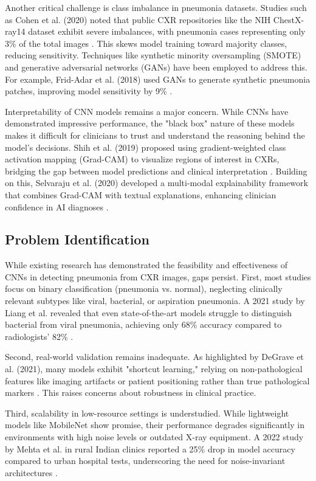 \documentclass[
  twocolumn,
  10pt,
  a4paper,
  journal
]{IEEEtran}
\begin{document}
Another critical challenge is class imbalance in pneumonia datasets. Studies such as Cohen et al. (2020) noted that public CXR repositories like the NIH ChestX-ray14 dataset exhibit severe imbalances, with pneumonia cases representing only 3\% of the total images \cite{cohen2020}. This skews model training toward majority classes, reducing sensitivity. Techniques like synthetic minority oversampling (SMOTE) and generative adversarial networks (GANs) have been employed to address this. For example, Frid-Adar et al. (2018) used GANs to generate synthetic pneumonia patches, improving model sensitivity by 9\% \cite{frid-adar2018}.

Interpretability of CNN models remains a major concern. While CNNs have demonstrated impressive performance, the "black box" nature of these models makes it difficult for clinicians to trust and understand the reasoning behind the model's decisions. Shih et al. (2019) proposed using gradient-weighted class activation mapping (Grad-CAM) to visualize regions of interest in CXRs, bridging the gap between model predictions and clinical interpretation \cite{shih2019}. Building on this, Selvaraju et al. (2020) developed a multi-modal explainability framework that combines Grad-CAM with textual explanations, enhancing clinician confidence in AI diagnoses \cite{selvaraju2020}.

\subsection{Problem Identification}

While existing research has demonstrated the feasibility and effectiveness of CNNs in detecting pneumonia from CXR images, gaps persist. First, most studies focus on binary classification (pneumonia vs. normal), neglecting clinically relevant subtypes like viral, bacterial, or aspiration pneumonia. A 2021 study by Liang et al. revealed that even state-of-the-art models struggle to distinguish bacterial from viral pneumonia, achieving only 68\% accuracy compared to radiologists' 82\% \cite{liang2021}.

Second, real-world validation remains inadequate. As highlighted by DeGrave et al. (2021), many models exhibit "shortcut learning," relying on non-pathological features like imaging artifacts or patient positioning rather than true pathological markers \cite{degrave2021}. This raises concerns about robustness in clinical practice.

Third, scalability in low-resource settings is understudied. While lightweight models like MobileNet show promise, their performance degrades significantly in environments with high noise levels or outdated X-ray equipment. A 2022 study by Mehta et al. in rural Indian clinics reported a 25\% drop in model accuracy compared to urban hospital tests, underscoring the need for noise-invariant architectures \cite{mehta2022}.
\end{document}
